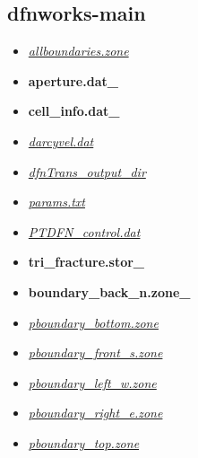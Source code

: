 \documentclass[letterpaper,10pt,english]{sphinxmanual}
\begin{document}
\subsection{dfnworks-main}
\label{output:dfnworks-main}\begin{itemize}
\item {} 
{\hyperref[output:allboundaries-zone]{\emph{allboundaries.zone}}}

\item {} 
{\color{red}\bfseries{}aperture.dat\_}

\item {} 
{\color{red}\bfseries{}cell\_info.dat\_}

\item {} 
{\hyperref[output:darcyvel-dat]{\emph{darcyvel.dat}}}

\item {} 
{\hyperref[output:dfntrans-output-dir]{\emph{dfnTrans\_output\_dir}}}

\item {} 
{\hyperref[output:params-txt]{\emph{params.txt}}}

\item {} 
{\hyperref[output:ptdfn-control-dat]{\emph{PTDFN\_control.dat}}}

\item {} 
{\color{red}\bfseries{}tri\_fracture.stor\_}

\item {} 
{\color{red}\bfseries{}boundary\_back\_n.zone\_}

\item {} 
{\hyperref[output:pboundary-bottom-zone]{\emph{pboundary\_bottom.zone}}}

\item {} 
{\hyperref[output:pboundary-front-s-zone]{\emph{pboundary\_front\_s.zone}}}

\item {} 
{\hyperref[output:pboundary-left-w-zone]{\emph{pboundary\_left\_w.zone}}}

\item {} 
{\hyperref[output:pboundary-right-e-zone]{\emph{pboundary\_right\_e.zone}}}

\item {} 
{\hyperref[output:pboundary-top-zone]{\emph{pboundary\_top.zone}}}

\end{itemize}
\end{document}
